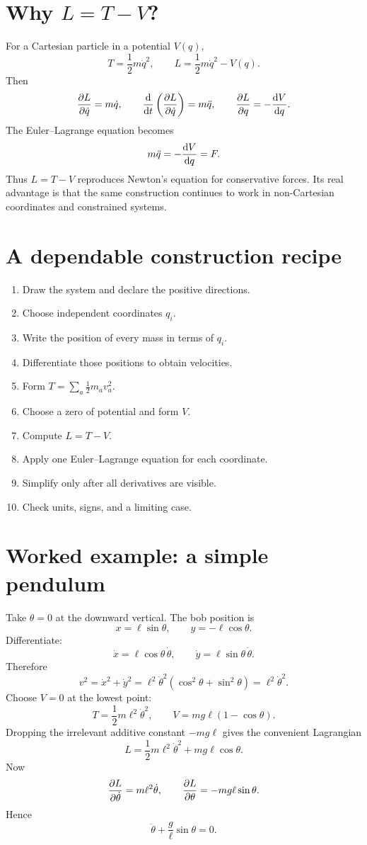 \documentclass[11pt,a4paper]{article}
\begin{document}
\section{Why $L=T-V$?}

For a Cartesian particle in a potential $V(q)$,
\[
T=\frac12m\dot q^2,
\qquad
L=\frac12m\dot q^2-V(q).
\]
Then
\[
\frac{\partial L}{\partial \dot q}=m\dot q,
\qquad
\frac{\mathop{}\!\mathrm d }{\mathop{}\!\mathrm d t}\left(\frac{\partial L}{\partial \dot q}\right)=m\ddot q,
\qquad
\frac{\partial L}{\partial q}=-\frac{\mathop{}\!\mathrm d V}{\mathop{}\!\mathrm d q}.
\]
The Euler--Lagrange equation becomes
\[
m\ddot q=-\frac{\mathop{}\!\mathrm d V}{\mathop{}\!\mathrm d q}=F.
\]
Thus $L=T-V$ reproduces Newton's equation for conservative forces. Its real advantage is that the same construction continues to work in non-Cartesian coordinates and constrained systems.

\section{A dependable construction recipe}

\begin{enumerate}
\item Draw the system and declare the positive directions.
\item Choose independent coordinates $q_i$.
\item Write the position of every mass in terms of $q_i$.
\item Differentiate those positions to obtain velocities.
\item Form $T=\sum_a \tfrac12m_a v_a^2$.
\item Choose a zero of potential and form $V$.
\item Compute $L=T-V$.
\item Apply one Euler--Lagrange equation for each coordinate.
\item Simplify only after all derivatives are visible.
\item Check units, signs, and a limiting case.
\end{enumerate}

\section{Worked example: a simple pendulum}

Take $\theta=0$ at the downward vertical. The bob position is
\[
x=\ell\sin\theta,
\qquad
y=-\ell\cos\theta.
\]
Differentiate:
\[
\dot x=\ell\cos\theta\,\dot\theta,
\qquad
\dot y=\ell\sin\theta\,\dot\theta.
\]
Therefore
\[
v^2=\dot x^2+\dot y^2
=\ell^2\dot\theta^2(\cos^2\theta+\sin^2\theta)
=\ell^2\dot\theta^2.
\]
Choose $V=0$ at the lowest point:
\[
T=\frac12m\ell^2\dot\theta^2,
\qquad
V=mg\ell(1-\cos\theta).
\]
Dropping the irrelevant additive constant $-mg\ell$ gives the convenient Lagrangian
\[
L=\frac12m\ell^2\dot\theta^2+mg\ell\cos\theta.
\]
Now
\[
\frac{\partial L}{\partial \dot\theta}=m\ell^2\dot\theta,
\qquad
\frac{\partial L}{\partial \theta}=-mg\ell\sin\theta.
\]
Hence
\[
\boxed{\ddot\theta+\frac g\ell\sin\theta=0.}
\]
\end{document}
